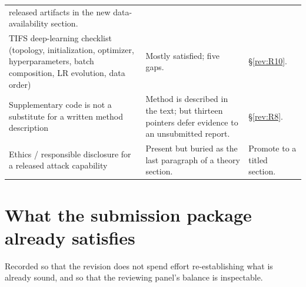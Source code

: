 \documentclass[11pt,a4paper]{article}
\begin{document}
\begin{longtable}{L{0.30\textwidth} L{0.30\textwidth} L{0.32\textwidth}}
released artifacts in the new data-availability section. \\
\addlinespace
TIFS deep-learning checklist (topology, initialization, optimizer,
hyperparameters, batch composition, LR evolution, data order) & Mostly
satisfied; five gaps. & \S\ref{rev:R10}. \\
\addlinespace
Supplementary code is not a substitute for a written method description &
Method is described in the text; but thirteen pointers defer evidence to an
unsubmitted report. & \S\ref{rev:R8}. \\
\addlinespace
Ethics / responsible disclosure for a released attack capability & Present but
buried as the last paragraph of a theory section. & Promote to a titled
section. \\
\bottomrule
\end{longtable}

\section{What the submission package already satisfies}
\label{sec:satisfied}

Recorded so that the revision does not spend effort re-establishing what is
already sound, and so that the reviewing panel's balance is inspectable.
\end{document}
